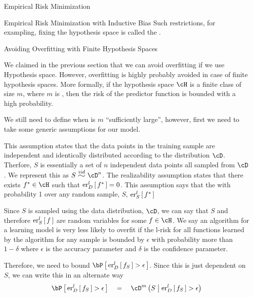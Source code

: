 \documentclass{article}
\begin{document}
\begin{ssection}{Empirical Risk Minimization}
\begin{ssubsection}{Empirical Risk Minimization with Inductive Bias}
		Such restrictions, for exampling, fixing the hypothesis space is called the .

	\end{ssubsection}

	\begin{ssubsection}{Avoiding Overfitting with Finite Hypothesis Spaces}

		We claimed in the previous section that we can avoid overfitting if we use Hypothesis space. However, overfitting is highly probably avoided in case of finite hypothesis spaces. More formally, if the hypothesis space $\cH$ is a finite class of size $m$, where $m$ is , then the risk of the predictor function is bounded with a high probability. \br

		 \br

		We still need to define when is $m$ ``sufficiently large'', however, first we need to take some generic assumptions for our model.

		\begin{enumerate}[label=\bt{\theenumi.}]
			 This assumption states that the data points in the training sample are independent and identically distributed according to the distribution $\cD$. Therfore, $S$ is essentially a set of $n$ independent data points all sampled from $\cD$. We represent this as $S \iid \cD^n$.
			 The realizability assumption states that there exists $f^\ast \in \cH$ such that $\err[_D^l]{f^\ast} = 0$. This assumption says that the with probability 1 over any random sample, $S$, $\err[_S^l]{f^\ast}$
		\end{enumerate}

		Since $S$ is sampled using the data distribution, $\cD$, we can say that $S$ and therefore $\err[_S^l]{f}$ are random variables for some $f \in \cH$. We say an algorithm for a learning model is very less likely to overfit if the l-risk for all functions learned by the algorithm for any sample is bounded by $\epsilon$ with probability more than $1 - \delta$ where $\epsilon$ is the accuracy parameter and $\delta$ is the confidence parameter. \br

		Therefore, we need to bound $\prob{\err[_D^l]{f_S} > \epsilon}$. Since this is just dependent on $S$, we can write this in an alternate way
		\begin{align*}
			\prob{\err[_D^l]{f_S} > \epsilon}	\eq	\cD^m \para{S \pipe \err[_D^l]{f_S} > \epsilon}
		\end{align*} \sbr


\end{ssubsection}
\end{ssection}
\end{document}
